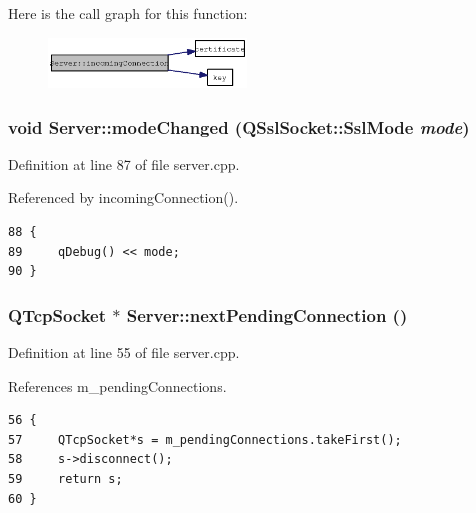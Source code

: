 Here is the call graph for this function:\nopagebreak
\begin{figure}[H]
\begin{center}
\leavevmode
\includegraphics[width=149pt]{classServer_48091e8b382412a1f63f05f4cc0ad599_cgraph}
\end{center}
\end{figure}
\subsubsection{\setlength{\rightskip}{0pt plus 5cm}void Server::modeChanged (QSslSocket::SslMode {\em mode})\hspace{0.3cm}{\tt  [protected, slot]}}\label{classServer_723b672f1a66356d8a3c929ed1e98ea2}




Definition at line 87 of file server.cpp.

Referenced by incomingConnection().

\begin{Code}\begin{verbatim}88 {
89     qDebug() << mode;
90 }
\end{verbatim}
\end{Code}


\subsubsection{\setlength{\rightskip}{0pt plus 5cm}QTcpSocket $\ast$ Server::nextPendingConnection ()\hspace{0.3cm}{\tt  [virtual]}}\label{classServer_5875629f158160cbeb4b2c20dfe51d75}




Definition at line 55 of file server.cpp.

References m\_\-pendingConnections.

\begin{Code}\begin{verbatim}56 {
57     QTcpSocket*s = m_pendingConnections.takeFirst();
58     s->disconnect();
59     return s;
60 }
\end{verbatim}
\end{Code}


